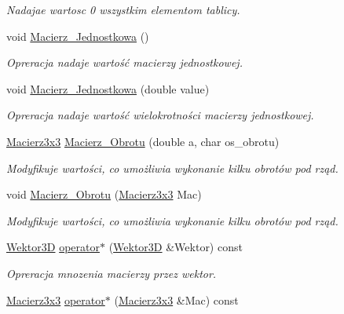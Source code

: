 \begin{DoxyCompactItemize}
\begin{DoxyCompactList}\small\item\em Nadajae wartosc 0 wszystkim elementom tablicy. \end{DoxyCompactList}\item 
\hypertarget{class_macierz3x3_a1124bb1bdaa8f4290583b5fd36e94fa8}{void \hyperlink{class_macierz3x3_a1124bb1bdaa8f4290583b5fd36e94fa8}{Macierz\+\_\+\+Jednostkowa} ()}\label{class_macierz3x3_a1124bb1bdaa8f4290583b5fd36e94fa8}

\begin{DoxyCompactList}\small\item\em Opreracja nadaje wartość macierzy jednostkowej. \end{DoxyCompactList}\item 
void \hyperlink{class_macierz3x3_a58cf5aad7a3743f92967a4ccfaf1fd38}{Macierz\+\_\+\+Jednostkowa} (double value)
\begin{DoxyCompactList}\small\item\em Opreracja nadaje wartość wielokrotności macierzy jednostkowej. \end{DoxyCompactList}\item 
\hyperlink{class_macierz3x3}{Macierz3x3} \hyperlink{class_macierz3x3_aeb18624a669e02c1e577fc08396ddf96}{Macierz\+\_\+\+Obrotu} (double a, char os\+\_\+obrotu)
\begin{DoxyCompactList}\small\item\em Modyfikuje wartości, co umożliwia wykonanie kilku obrotów pod rząd. \end{DoxyCompactList}\item 
void \hyperlink{class_macierz3x3_a00ff4bdc245653c88d1d0f9b3c54c011}{Macierz\+\_\+\+Obrotu} (\hyperlink{class_macierz3x3}{Macierz3x3} Mac)
\begin{DoxyCompactList}\small\item\em Modyfikuje wartości, co umożliwia wykonanie kilku obrotów pod rząd. \end{DoxyCompactList}\item 
\hypertarget{class_macierz3x3_a3060a106c9b07a460b279be95012f70b}{\hyperlink{class_wektor3_d}{Wektor3\+D} \hyperlink{class_macierz3x3_a3060a106c9b07a460b279be95012f70b}{operator$\ast$} (\hyperlink{class_wektor3_d}{Wektor3\+D} \&Wektor) const }\label{class_macierz3x3_a3060a106c9b07a460b279be95012f70b}

\begin{DoxyCompactList}\small\item\em Opreracja mnozenia macierzy przez wektor. \end{DoxyCompactList}\item 
\hypertarget{class_macierz3x3_acb6935027b981784dc16607c36d66a77}{\hyperlink{class_macierz3x3}{Macierz3x3} \hyperlink{class_macierz3x3_acb6935027b981784dc16607c36d66a77}{operator$\ast$} (\hyperlink{class_macierz3x3}{Macierz3x3} \&Mac) const }\label{class_macierz3x3_acb6935027b981784dc16607c36d66a77}


\end{DoxyCompactItemize}
